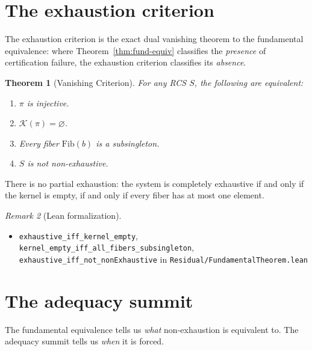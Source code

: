\documentclass[11pt,a4paper]{article}
\theoremstyle{plain}
\newtheorem{theorem}{Theorem}[section]
\theoremstyle{definition}
\theoremstyle{remark}
\newtheorem{remark}[theorem]{Remark}
\newcommand{\compare}{\pi}
\newcommand{\Fib}{\mathrm{Fib}}
\newcommand{\Ker}{\mathcal{K}}
\begin{document}
\section{The exhaustion criterion}\label{sec:exhaust-crit}

The exhaustion criterion is the exact dual vanishing theorem to the
fundamental equivalence: where Theorem~\ref{thm:fund-equiv} classifies
the \emph{presence} of certification failure, the exhaustion criterion
classifies its \emph{absence}.

\begin{theorem}[Vanishing Criterion]\label{thm:exhaust}
For any RCS $S$, the following are equivalent:
\begin{enumerate}[label=(\roman*)]
\item $\compare$ is injective.
\item $\Ker(\compare) = \varnothing$.
\item Every fiber $\Fib(b)$ is a subsingleton.
\item $S$ is not non-exhaustive.
\end{enumerate}
\end{theorem}

There is no partial exhaustion: the system is completely exhaustive if and only
if the kernel is empty, if and only if every fiber has at most one element.

\begin{remark}[Lean formalization]
\leavevmode\par\begin{itemize}[nosep,leftmargin=*,before=\raggedright]
\item \texttt{exhaustive\_iff\_kernel\_empty}, \texttt{kernel\_empty\_iff\_\allowbreak{}all\_fibers\_subsingleton}, \texttt{exhaustive\_iff\_not\_nonExhaustive} in \texttt{Residual/FundamentalTheorem.lean}
\end{itemize}
\end{remark}

\section{The adequacy summit}\label{sec:adequacy}

The fundamental equivalence tells us \emph{what} non-exhaustion is equivalent to.
The adequacy summit tells us \emph{when} it is forced.
\end{document}
